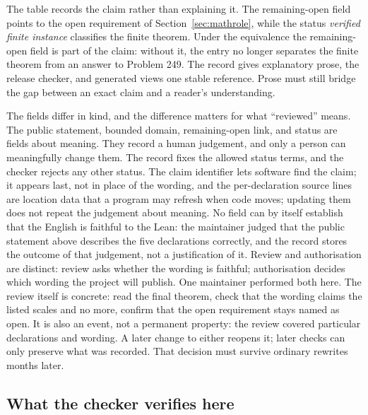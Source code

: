 \documentclass[11pt]{article}
\begin{document}
The table records the claim rather than explaining it.  The remaining-open
field points to the open requirement of Section~\ref{sec:mathrole}, while the
status \emph{verified finite instance}
classifies the finite theorem.  Under the equivalence the remaining-open field
is part of the claim: without it, the entry no longer separates the finite
theorem from an answer to Problem 249.  The record gives explanatory prose,
the release checker, and generated views one stable reference.  Prose must
still bridge the gap between an exact claim and a reader's understanding.

The fields differ in kind, and the difference matters for what
``reviewed'' means.  The public statement, bounded domain, remaining-open
link, and status are fields about meaning.  They record a human judgement, and
only a person can meaningfully change them.  The record fixes the allowed
status terms, and the checker rejects any other status.  The claim identifier
lets software find the claim; it appears last, not in
place of the wording, and the per-declaration
source lines are location data that a program may refresh when code moves;
updating them does not repeat the judgement about meaning.  No field can by
itself establish that the English is faithful to the Lean: the maintainer judged that the public
statement above describes the five declarations correctly, and the record
stores the outcome of that judgement, not a justification of it.  Review and
authorisation are distinct: review asks whether the wording is faithful;
authorisation decides which wording the project will publish.  One
maintainer performed both here.  The review itself is concrete: read the final theorem, check that the
wording claims the listed scales and no more, confirm that the open
requirement stays named as open.  It is also an event, not a permanent
property: the review covered particular declarations and wording.  A later
change to either reopens it; later checks can only preserve what was recorded.
That decision must survive ordinary rewrites months later.

\subsection{What the checker verifies here}
\end{document}
